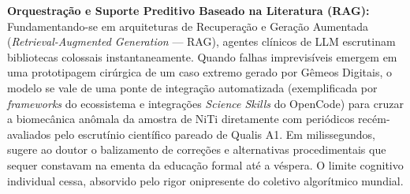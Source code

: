 \textbf{Orquestração e Suporte Preditivo Baseado na Literatura (RAG):} Fundamentando-se em arquiteturas de Recuperação e Geração Aumentada (\textit{Retrieval-Augmented Generation} --- RAG), agentes clínicos de LLM escrutinam bibliotecas colossais instantaneamente. Quando falhas imprevisíveis emergem em uma prototipagem cirúrgica de um caso extremo gerado por Gêmeos Digitais, o modelo se vale de uma ponte de integração automatizada (exemplificada por \textit{frameworks} do ecossistema e integrações \textit{Science Skills} do OpenCode) para cruzar a biomecânica anômala da amostra de NiTi diretamente com periódicos recém-avaliados pelo escrutínio científico pareado de Qualis A1. Em milissegundos, sugere ao doutor o balizamento de correções e alternativas procedimentais que sequer constavam na ementa da educação formal até a véspera. O limite cognitivo individual cessa, absorvido pelo rigor onipresente do coletivo algorítmico mundial.
